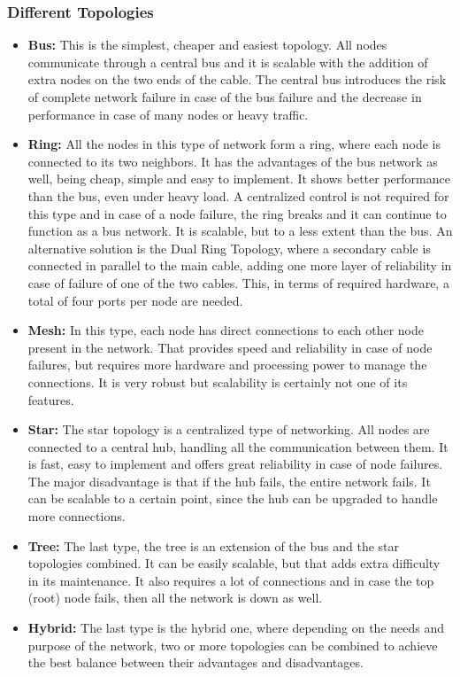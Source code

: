 \subsubsection{Different Topologies}
\begin{itemize}
\item \textbf{Bus:} This is the simplest, cheaper and easiest topology. All nodes communicate through a central bus and it is scalable with the addition of extra nodes on the two ends of the cable. The central bus introduces the risk of complete network failure in case of the bus failure and the decrease in performance in case of many nodes or heavy traffic.
\item \textbf{Ring:} All the nodes in this type of network form a ring, where each node is connected to its two neighbors. It has the advantages of the bus network as well, being cheap, simple and easy to implement. It shows better performance than the bus, even under heavy load. A centralized control is not required for this type and in case of a node failure, the ring breaks and it can continue to function as a bus network. It is scalable, but to a less extent than the bus. An alternative solution is the Dual Ring Topology, where a secondary cable is connected in parallel to the main cable, adding one more layer of reliability in case of failure of one of the two cables. This, in terms of required hardware, a total of four ports per node are needed.
\item \textbf{Mesh:} In this type, each node has direct connections to each other node present in the network. That provides speed and reliability in case of node failures, but requires more hardware and processing power to manage the connections. It is very robust but scalability is certainly not one of its features.
\item \textbf{Star:} The star topology is a centralized type of networking. All nodes are connected to a central hub, handling all the communication between them. It is fast, easy to implement and offers great reliability in case of node failures. The major disadvantage is that if the hub fails, the entire network fails. It can be scalable to a certain point, since the hub can be upgraded to handle more connections.
\item \textbf{Tree:} The last type, the tree is an extension of the bus and the star topologies combined. It can be easily scalable, but that adds extra difficulty in its maintenance. It also requires a lot of connections and in case the top (root) node fails, then all the network is down as well.
\item \textbf{Hybrid:} The last type is the hybrid one, where depending on the needs and purpose of the network, two or more topologies can be combined to achieve the best balance between their advantages and disadvantages.
\end{itemize}

